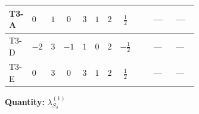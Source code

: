 \documentclass[8pt]{article}
\begin{document}
\begin{landscape}
\begin{longtable}{@{}llcccccc >{\raggedright\arraybackslash}p{0.21\linewidth} >{\raggedright\arraybackslash}p{0.21\linewidth} >{\raggedright\arraybackslash}p{0.21\linewidth}@{}}
\midrule
T3-A & $0$ & $1$ & $0$ & $3$ & $1$ & $2$ & $\frac{1}{2}$ & \scriptsize\adjustbox{max width=\linewidth}{$\begin{gathered} -3 \operatorname{Tr}\!\left({y_2}\,\left({y_2}\right)^{\dagger}\,{y_2}\,\left({y_2}\right)^{\dagger}\right)\end{gathered}$} & --- & --- \\
\midrule
T3-D & $-2$ & $3$ & $-1$ & $1$ & $0$ & $2$ & $-\frac{1}{2}$ & \scriptsize\adjustbox{max width=\linewidth}{$\begin{gathered} -8 \operatorname{Tr}\!\left({y_2}\,\left({y_2}\right)^{\dagger}\,{y_2}\,\left({y_2}\right)^{\dagger}\right)\end{gathered}$} & --- & --- \\
\midrule
T3-E & $0$ & $3$ & $0$ & $3$ & $1$ & $2$ & $\frac{1}{2}$ & \scriptsize\adjustbox{max width=\linewidth}{$\begin{gathered} -3 \operatorname{Tr}\!\left({y_2}\,\left({y_2}\right)^{\dagger}\,{y_2}\,\left({y_2}\right)^{\dagger}\right)\end{gathered}$} & --- & --- \\
\midrule
\bottomrule
\end{longtable}
\clearpage
\noindent\textbf{Quantity: }$\lambda_{S_2}^{(1)}$\par\smallskip

\end{landscape}
\end{document}
